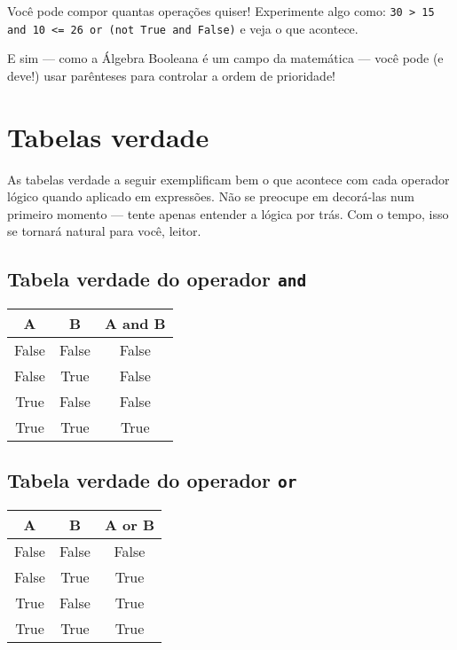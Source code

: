 \documentclass[12pt]{book}
\begin{document}
	\begin{tcolorbox}[colback=gray!10, colframe=black, title={\large\bfseries Dica}]
		Você pode compor quantas operações quiser! Experimente algo como: \texttt{30 > 15 and 10 <= 26 or (not True and False)} e veja o que acontece. \newline
		
		E sim — como a Álgebra Booleana é um campo da matemática — você pode (e deve!) usar parênteses para controlar a ordem de prioridade!
	\end{tcolorbox}
	
	\section{Tabelas verdade}
	
	As tabelas verdade a seguir exemplificam bem o que acontece com cada operador lógico quando aplicado em expressões. Não se preocupe em decorá-las num primeiro momento — tente apenas entender a lógica por trás. Com o tempo, isso se tornará natural para você, leitor.
	
	\subsection*{Tabela verdade do operador \texttt{and}}
	
	\begin{center}
		\begin{tabular}{|c|c|c|}
			\hline
			\textbf{A} & \textbf{B} & \textbf{A and B} \\
			\hline
			False & False & False \\
			False & True  & False \\
			True  & False & False \\
			True  & True  & True  \\
			\hline
		\end{tabular}
	\end{center}
	
	
	\subsection*{Tabela verdade do operador \texttt{or}}
	
	\begin{center}
		\begin{tabular}{|c|c|c|}
			\hline
			\textbf{A} & \textbf{B} & \textbf{A or B} \\
			\hline
			False & False & False \\
			False & True  & True  \\
			True  & False & True  \\
			True  & True  & True  \\
			\hline
		\end{tabular}
	\end{center}
	
\end{document}
